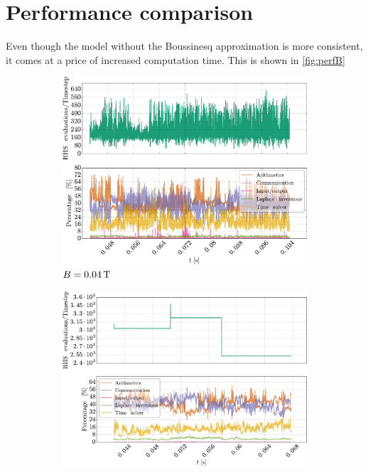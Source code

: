 \section{Performance comparison}
%
Even though the model without the Boussinesq approximation is more consistent, it comes at a price of increased computation time.
This is shown in \cref{fig:perfB}
%
\begin{figure}[htbp]
    \centering
    \begin{subfigure}[h]{0.45\textwidth}
        \centering
        \includegraphics[width=1.0\textwidth]{fig/results/compareBouss/performance004B}
        \caption{$B=0.04\, \text{T}$}
        \label{fig:perf004B}
    \end{subfigure}%
    \hfill
    \begin{subfigure}[h]{0.45\textwidth}
        \centering
        \includegraphics[width=1.0\textwidth]{fig/results/performance/performance004}

\end{subfigure}
\end{figure}
